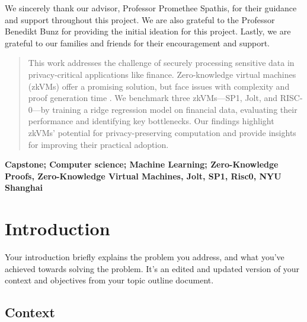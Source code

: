 \documentclass{scrartcl}
\begin{document}
\vspace{1cm}

\begin{acknowledgements}
We sincerely thank our advisor, Professor Promethee Spathis, for their guidance and support throughout this project. We are also grateful to the Professor Benedikt Bunz for providing the initial ideation for this project. Lastly, we are grateful to our families and friends for their encouragement and support.\end{acknowledgements}

\newpage


\begin{abstract}
This work addresses the challenge of securely processing sensitive data in privacy-critical applications like finance. Zero-knowledge virtual machines (zkVMs) offer a promising solution, but face issues with complexity and proof generation time . We benchmark three zkVMs—SP1, Jolt, and RISC-0—by training a ridge regression model on financial data, evaluating their performance and identifying key bottlenecks. Our findings highlight zkVMs’ potential for privacy-preserving computation and provide insights for improving their practical adoption.
\end{abstract}
\vspace{1cm}

\begin{keywords}
\centering
         \textbf{Capstone; Computer science; Machine Learning; Zero-Knowledge Proofs, Zero-Knowledge Virtual Machines, Jolt, SP1, Risc0, NYU Shanghai}
\end{keywords}

\newpage



\doublespacing
\tableofcontents
\singlespacing

\newpage

\doublespacing

\section{Introduction}

Your introduction briefly explains the problem you address, and what you've achieved towards solving the problem. It's an edited and updated version of your context and objectives from your topic outline document.

\subsection{Context}
\end{document}
